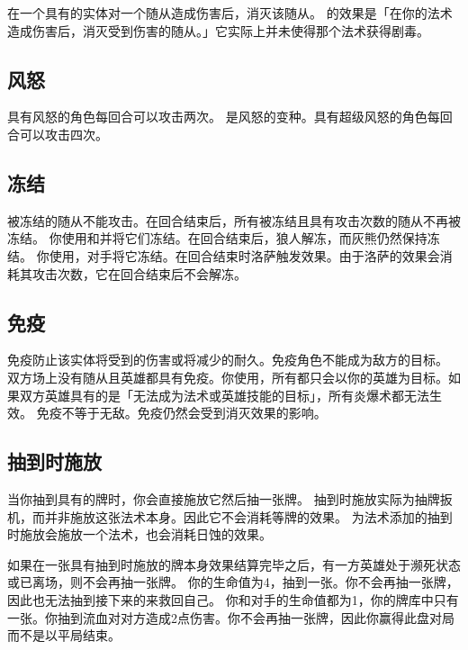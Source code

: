 在一个具有的实体对一个随从造成伤害后，消灭该随从。
\notice {}的效果是「在你的法术造成伤害后，消灭受到伤害的随从。」它实际上并未使得那个法术获得剧毒。

\subsection{风怒}
\label{windfury}

具有风怒的角色每回合可以攻击两次。
\notice {}是风怒的变种。具有超级风怒的角色每回合可以攻击四次。

\subsection{冻结}
\label{freeze}

被冻结的随从不能攻击。在回合结束后，所有被冻结且具有攻击次数的随从不再被冻结。
\example 你使用和并将它们冻结。在回合结束后，狼人解冻，而灰熊仍然保持冻结。
\example 你使用，对手将它冻结。在回合结束时洛萨触发效果。由于洛萨的效果会消耗其攻击次数，它在回合结束后不会解冻。

\subsection{免疫}
\label{immune}

免疫防止该实体将受到的伤害或将减少的耐久。免疫角色不能成为敌方的目标。
\example 双方场上没有随从且英雄都具有免疫。你使用，所有都只会以你的英雄为目标。如果双方英雄具有的是「无法成为法术或英雄技能的目标」，所有炎爆术都无法生效。
\notice 免疫不等于无敌。免疫仍然会受到消灭效果的影响。

\subsection{抽到时施放}
\label{cast-when-drawn}

当你抽到具有的牌时，你会直接施放它然后抽一张牌。
\notice 抽到时施放实际为抽牌扳机，而并非施放这张法术本身。因此它不会消耗等牌的效果。
\exception {}为法术添加的抽到时施放会施放一个法术，也会消耗日蚀的效果。

如果在一张具有抽到时施放的牌本身效果结算完毕之后，有一方英雄处于濒死状态或已离场，则不会再抽一张牌。
\example 你的生命值为4，抽到一张。你不会再抽一张牌，因此也无法抽到接下来的来救回自己。
\example 你和对手的生命值都为1，你的牌库中只有一张。你抽到流血对对方造成2点伤害。你不会再抽一张牌，因此你赢得此盘对局而不是以平局结束。

